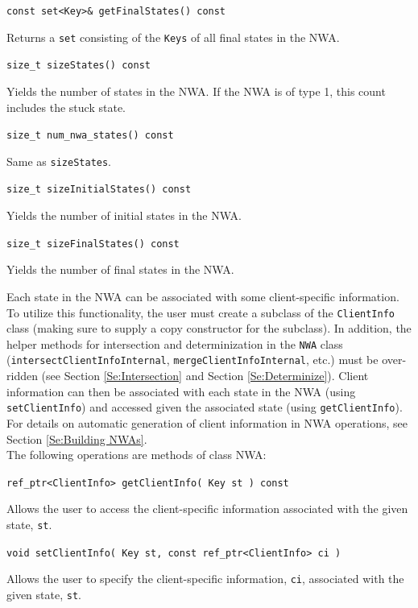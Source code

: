 \documentclass{llncs}
\begin{document}
\begin{description}
  \item\texttt{const set<Key>\& getFinalStates() const}

    Returns a \texttt{set} consisting of the \texttt{Keys} of all final states in the NWA.

  \item\texttt{size\_t sizeStates() const}

    Yields the number of states in the NWA.  If the NWA is of type 1, this count includes the stuck state.

  \item\texttt{size\_t num\_nwa\_states() const}

    Same as \texttt{sizeStates}.

  \item\texttt{size\_t sizeInitialStates() const}

    Yields the number of initial states in the NWA.

  \item\texttt{size\_t sizeFinalStates() const}

    Yields the number of final states in the NWA. \\

\end{description}

Each state in the NWA can be associated with some client-specific information. To utilize this functionality, the user must create a subclass of the \texttt{ClientInfo} class (making sure to supply a copy constructor for the subclass).  In addition, the helper methods for intersection and determinization in the \texttt{NWA} class (\texttt{intersectClientInfoInternal}, \texttt{mergeClientInfoInternal}, etc.) must be over-ridden (see Section \ref{Se:Intersection} and Section \ref{Se:Determinize}).  Client information can then be associated with each state in the NWA (using \texttt{setClientInfo}) and accessed given the associated state (using \texttt{getClientInfo}).  For details on automatic generation of client information in NWA operations, see Section \ref{Se:Building NWAs}. \\  

\noindent The following operations are methods of class NWA:

\begin{description}

  \item\texttt{ref\_ptr<ClientInfo> getClientInfo( Key st ) const}

    Allows the user to access the client-specific information associated with the given state, \texttt{st}.

  \item\texttt{void setClientInfo( Key st, const ref\_ptr<ClientInfo> ci )}

    Allows the user to specify the client-specific information, \texttt{ci}, associated with the given state, \texttt{st}. \\

\end{description}
\end{document}
